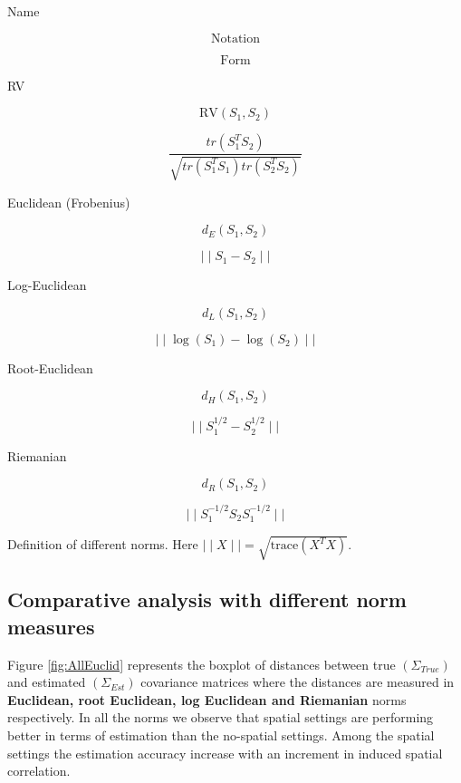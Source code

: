 \documentclass[
]{book}
\begin{document}
Name

\[ \text{Notation} \]

\[ \text{Form} \]

RV

\[ \text{RV}(S_{1},S_{2}) \]

\[\frac{ tr(  S_{1}^{T} S_{2} ) }{ \sqrt{ tr(  S_{1}^{T} S_{1} )  tr(  S_{2}^{T} S_{2} ) }  } \]

Euclidean (Frobenius)

\[ d_{E}(S_{1},S_{2}) \]

\[\mid \mid S_{1} - S_{2} \mid \mid \]

Log-Euclidean

\[d_{L}(S_{1},S_{2})\]

\[\mid \mid \log(S_{1}) - \log(S_{2}) \mid \mid \]

Root-Euclidean

\[d_{H}(S_{1},S_{2})\]

\[\mid \mid S_{1}^{1/2} - S_{2}^{1/2} \mid \mid \]

Riemanian

\[d_{R}(S_{1},S_{2})\]

\[\mid \mid S_{1}^{-1/2} S_{2} S_{1}^{-1/2} \mid \mid \]

\label{tab:Normtable} Definition of different norms. Here \(\mid \mid X \mid \mid = \sqrt{\text{trace}(X^{T}X)}\).

\hypertarget{comparative-analysis-with-different-norm-measures}{%
\subsection{Comparative analysis with different norm measures}\label{comparative-analysis-with-different-norm-measures}}

Figure \ref{fig:AllEuclid} represents the boxplot of distances between true \((\Sigma_{True})\) and estimated \((\Sigma_{Est})\) covariance matrices where the distances are measured in \textbf{Euclidean, root Euclidean, log Euclidean and Riemanian} norms respectively. In all the norms we observe that spatial settings are performing better in terms of estimation than the no-spatial settings. Among the spatial settings the estimation accuracy increase with an increment in induced spatial correlation.
\end{document}
